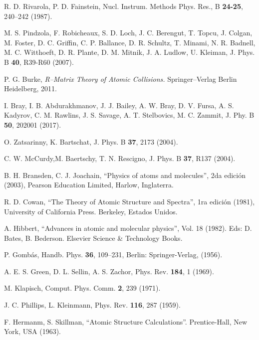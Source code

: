 \begin{thebibliography}{9}
R. D. Rivarola, P. D. Fainstein,
Nucl. Instrum. Methods Phys. Res., B \textbf{24-25}, 240--242 (1987).

M. S. Pindzola, F. Robicheaux, S. D. Loch, J. C. Berengut, T. Topcu, 
J. Colgan, M. Foster, D. C. Griffin, C. P. Ballance, D. R. Schultz,
T. Minami, N. R. Badnell, M. C. Witthoeft, D. R. Plante, D. M. Mitnik, 
J. A. Ludlow, U. Kleiman, 
J. Phys. B \textbf{40}, R39-R60 (2007).

P. G. Burke, 
\textit{R--Matrix Theory of Atomic Collisions.}
Springer--Verlag Berlin Heidelberg, 2011.

I. Bray, I. B. Abdurakhmanov, J. J. Bailey, A. W. Bray, D. V. Fursa,
A. S. Kadyrov, C. M. Rawlins, J. S. Savage, A. T. Stelbovics, 
M. C. Zammit,
J. Phy. B \textbf{50}, 202001 (2017).

O. Zatsarinny, K. Bartschat,
J. Phys. B \textbf{37}, 2173 (2004).

C. W. McCurdy,M.  Baertschy, T. N. Rescigno,
J. Phys. B \textbf{37}, R137 (2004).

B. H. Bransden, C. J. Joachain,
``Physics of atoms and molecules'', 2da edición (2003),
Pearson Education Limited, Harlow, Inglaterra.

R. D. Cowan,
``The Theory of Atomic Structure and Spectra'', 1ra edición (1981),
University of California Press. Berkeley, Estados Unidos.


A. Hibbert,
``Advances in atomic and molecular physics'', Vol. 18 (1982).
Eds: D. Bates, B. Bederson. Elsevier Science \& Technology Books.

P. Gombás, 
Handb. Phys. \textbf{36}, 109--231, Berlin: Springer-Verlag, (1956).

A. E. S. Green, D. L. Sellin, A. S. Zachor,
Phys. Rev. \textbf{184}, 1 (1969).

M. Klapisch,
Comput. Phys. Comm. \textbf{2}, 239 (1971).

J. C. Phillips, L. Kleinmann,
Phys. Rev. \textbf{116}, 287 (1959).

F. Hermanm, S. Skillman,
``Atomic Structure Calculations''. 
Prentice-Hall, New York, USA (1963).


\end{thebibliography}
